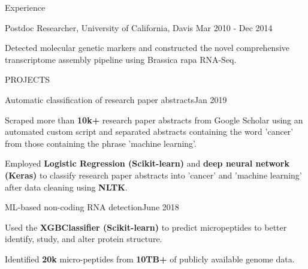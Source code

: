 \documentclass{resume} %
\begin{document}
\begin{rSection}{Experience }
\begin{rSubsection}{Postdoc Researcher, University of California, Davis}
{Mar 2010 - Dec 2014}{}{}  %
\vspace{-3pt}

\item Detected molecular genetic markers and constructed the novel comprehensive transcriptome assembly pipeline using Brassica rapa RNA-Seq.

\vspace{-7pt}

\end{rSubsection}  

\end{rSection}


\begin{rSection}{PROJECTS}

\begin{rSubsection}{Automatic classification of research paper abstracts}{Jan 2019}{} %

\vspace{-3pt}
\item Scraped more than \textbf{10k+} research paper abstracts from Google Scholar using an automated custom script and separated abstracts containing the word 'cancer' from those containing the phrase 'machine learning'.
\item Employed \textbf{Logistic Regression (Scikit-learn)} and \textbf{deep neural network (Keras)} to classify research paper abstracts into 'cancer' and 'machine learning' after data cleaning using \textbf{NLTK}. \end{rSubsection} 

\vspace{-7pt}

\begin{rSubsection}{ML-based non-coding RNA detection}{June 2018}{} %

\vspace{-3pt}

\item Used the \textbf{XGBClassifier (Scikit-learn)} to predict micropeptides to better identify, study, and alter protein structure.
\item Identified \textbf{20k} micro-peptides from \textbf{10TB+} of publicly available genome data.
\end{rSubsection} 

\vspace{-7pt}

\end{rSection}
\end{document}
